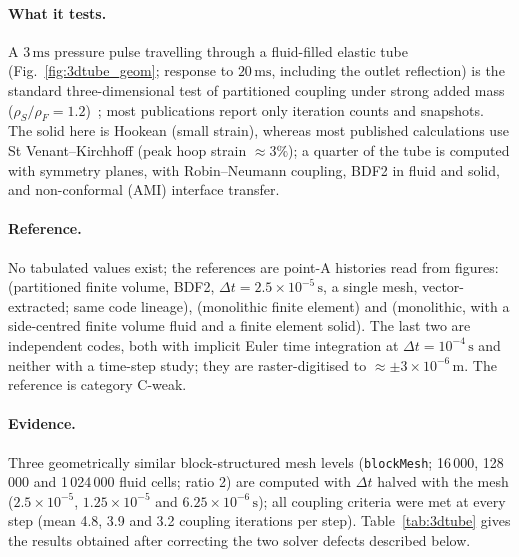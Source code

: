 \paragraph{What it tests.}
A $3\,\mathrm{ms}$ pressure pulse travelling through a fluid-filled elastic tube (Fig.~\ref{fig:3dtube_geom}; response to $20\,\mathrm{ms}$, including the outlet reflection) is the standard three-dimensional test of partitioned coupling under strong added mass ($\rho_S/\rho_F = 1.2$)~\citep{Formaggia2001, Gerbeau2003, Fernandez2005, kuttler2008fixed, Degroote2009}; most publications report only iteration counts and snapshots.
The solid here is Hookean (small strain), whereas most published calculations use St Venant--Kirchhoff (peak hoop strain $\approx3\%$); a quarter of the tube is computed with symmetry planes, with Robin--Neumann coupling, BDF2 in fluid and solid, and non-conformal (AMI) interface transfer.

\paragraph{Reference.}
No tabulated values exist; the references are point-A histories read from figures: \citet{Tukovic2018} (partitioned finite volume, BDF2, $\Delta t = 2.5\times10^{-5}\,\mathrm{s}$, a single mesh, vector-extracted; same code lineage), \citet{Lozovskiy2019} (monolithic finite element) and \citet{Eken2016} (monolithic, with a side-centred finite volume fluid and a finite element solid).
The last two are independent codes, both with implicit Euler time integration at $\Delta t = 10^{-4}\,\mathrm{s}$ and neither with a time-step study; they are raster-digitised to $\approx\pm3\times10^{-6}\,\mathrm{m}$.
The reference is category C-weak.

\paragraph{Evidence.}
Three geometrically similar block-structured mesh levels (\texttt{blockMesh}; 16\,000, 128\,000 and 1\,024\,000 fluid cells; ratio 2) are computed with $\Delta t$ halved with the mesh ($2.5\times10^{-5}$, $1.25\times10^{-5}$ and $6.25\times10^{-6}\,\mathrm{s}$); all coupling criteria were met at every step (mean 4.8, 3.9 and 3.2 coupling iterations per step).
Table~\ref{tab:3dtube} gives the results obtained after correcting the two solver defects described below.

